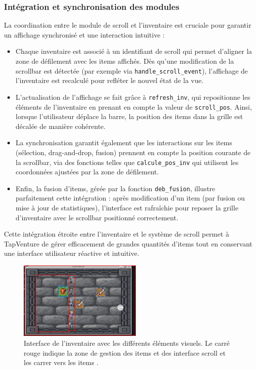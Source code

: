 \documentclass[11pt,a4paper]{article}
\begin{document}
\subsubsection{Intégration et synchronisation des modules}
La coordination entre le module de scroll et l'inventaire est cruciale pour garantir un affichage synchronisé et une interaction intuitive :
\begin{itemize}
    \item Chaque inventaire est associé à un identifiant de scroll qui permet d'aligner la zone de défilement avec les items affichés. Dès qu'une modification de la scrollbar est détectée (par exemple via \texttt{handle\_scroll\_event}), l'affichage de l'inventaire est recalculé pour refléter le nouvel état de la vue.
    \item L'actualisation de l'affichage se fait grâce à \texttt{refresh\_inv}, qui repositionne les éléments de l'inventaire en prenant en compte la valeur de \texttt{scroll\_pos}. Ainsi, lorsque l'utilisateur déplace la barre, la position des items dans la grille est décalée de manière cohérente.
    \item La synchronisation garantit également que les interactions sur les items (sélection, drag-and-drop, fusion) prennent en compte la position courante de la scrollbar, via des fonctions telles que \texttt{calcule\_pos\_inv} qui utilisent les coordonnées ajustées par la zone de défilement.
    \item Enfin, la fusion d'items, gérée par la fonction \texttt{deb\_fusion}, illustre parfaitement cette intégration : après modification d'un item (par fusion ou mise à jour de statistiques), l'interface est rafraîchie pour reposer la grille d'inventaire avec le scrollbar positionné correctement.
\end{itemize}
Cette intégration étroite entre l'inventaire et le système de scroll permet à TapVenture de gérer efficacement de grandes quantités d'items tout en conservant une interface utilisateur réactive et intuitive.
\begin{figure}[h]
    \centering
    \includegraphics[width=6cm]{img/inv.png}
    \caption{Interface de l'inventaire avec les différents éléments visuels. Le carré rouge indique la zone de gestion des items et des interface scroll et les carrer vers les items .}
    \label{interface}
\end{figure}
\end{document}
